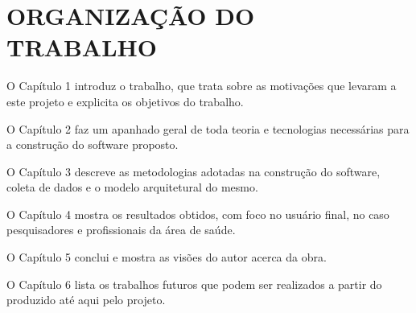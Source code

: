 \section[ORGANIZAÇÃO DO TRABALHO]{ORGANIZAÇÃO DO TRABALHO}

O Capítulo 1 introduz o trabalho, que trata sobre as motivações que levaram a este projeto e explicita os objetivos do trabalho.

O Capítulo 2 faz um apanhado geral de toda teoria  e tecnologias necessárias para a construção do software proposto.

O Capítulo 3 descreve as metodologias adotadas na construção do software, coleta de dados e o modelo arquitetural do mesmo.

O Capítulo 4 mostra os resultados obtidos, com foco no usuário final, no caso pesquisadores e profissionais da área de saúde.

O Capítulo 5 conclui e mostra as visões do autor acerca da obra.

O Capítulo 6 lista os trabalhos futuros que podem ser realizados a partir do produzido até aqui pelo projeto.
